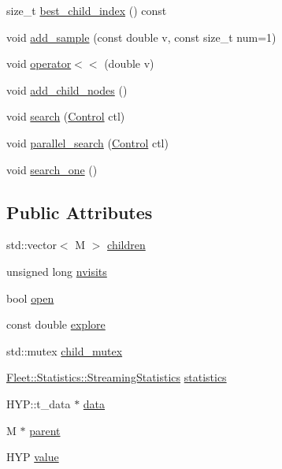 \begin{DoxyCompactItemize}
\item 
size\+\_\+t \hyperlink{class_m_c_t_s_node_a64290d7134b6841a49e84a244512bd19}{best\+\_\+child\+\_\+index} () const
\item 
void \hyperlink{class_m_c_t_s_node_a1c6a25035bdfd87764072f3a5df16715}{add\+\_\+sample} (const double v, const size\+\_\+t num=1)
\item 
void \hyperlink{class_m_c_t_s_node_ad72e84b8b8c6e814dfae4a697ddb6acd}{operator$<$$<$} (double v)
\item 
void \hyperlink{class_m_c_t_s_node_adf984e74107202a9891e6338eef53ea2}{add\+\_\+child\+\_\+nodes} ()
\item 
void \hyperlink{class_m_c_t_s_node_a0cf85ac07dd2a3f21fea0737834b8cf1}{search} (\hyperlink{struct_control}{Control} ctl)
\item 
void \hyperlink{class_m_c_t_s_node_acd94e02e155886ab71a2922815cd8285}{parallel\+\_\+search} (\hyperlink{struct_control}{Control} ctl)
\item 
void \hyperlink{class_m_c_t_s_node_ad0766d2829bb1cb252dd6aac51ac0d95}{search\+\_\+one} ()
\end{DoxyCompactItemize}
\subsection*{Public Attributes}
\begin{DoxyCompactItemize}
\item 
std\+::vector$<$ M $>$ \hyperlink{class_m_c_t_s_node_a243b348036c57a54af3a48a708851b80}{children}
\item 
unsigned long \hyperlink{class_m_c_t_s_node_a277d083d477ab4aaeeadfadada1cdc24}{nvisits}
\item 
bool \hyperlink{class_m_c_t_s_node_aa4d0f6bb2603cfe995aaafc5d208ec16}{open}
\item 
const double \hyperlink{class_m_c_t_s_node_ad1a742de2cdd0e208079bc35f943cacc}{explore}
\item 
std\+::mutex \hyperlink{class_m_c_t_s_node_a66790ec812754c13bab5f6f14966bacf}{child\+\_\+mutex}
\item 
\hyperlink{class_fleet_1_1_statistics_1_1_streaming_statistics}{Fleet\+::\+Statistics\+::\+Streaming\+Statistics} \hyperlink{class_m_c_t_s_node_a47cdbf0ef4f1e6ccbb6e911d4d384f39}{statistics}
\item 
H\+Y\+P\+::t\+\_\+data $\ast$ \hyperlink{class_m_c_t_s_node_af58c9958a7092d4e09b58bd94b7c9f58}{data}
\item 
M $\ast$ \hyperlink{class_m_c_t_s_node_ab451a032b940daa976b7a5773d3246ca}{parent}
\item 
H\+YP \hyperlink{class_m_c_t_s_node_a0442ab9a9378dabcd98ac7254b2e70a8}{value}
\end{DoxyCompactItemize}


